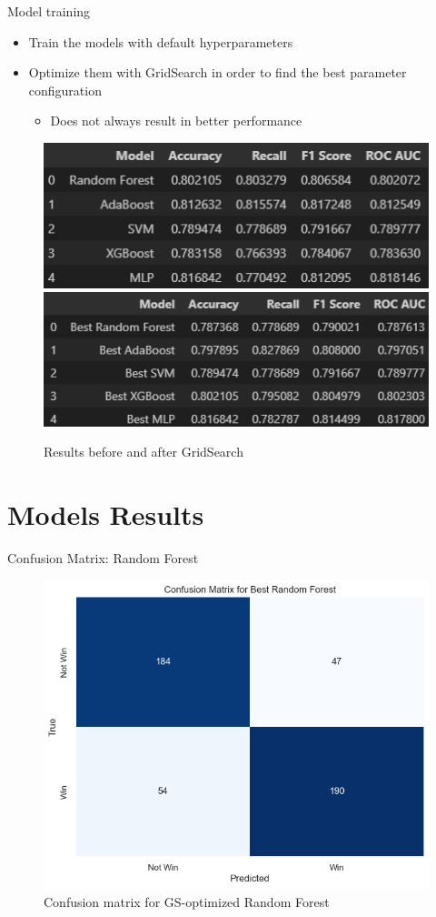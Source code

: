 \documentclass{beamer}
\begin{document}
\begin{frame}{Model training}
    \begin{itemize}
        \item Train the models with default hyperparameters
        \item Optimize them with GridSearch in order to find the best parameter configuration
            \begin{itemize}
                \item Does not always result in better performance
            \end{itemize}
    \end{itemize}
    \begin{figure}
        \centering
        \includegraphics[width=0.5\linewidth]{images/model_results.png}
        \includegraphics[width=0.5\linewidth]{images/best_model_results.png}
        \caption{Results before and after GridSearch}
        \label{fig:enter-label}
    \end{figure}
\end{frame}

\section{Models Results}
\begin{frame}{Confusion Matrix: Random Forest}
    \begin{figure}
        \centering
        \includegraphics[width=0.7\linewidth]{images/cm_randomforest.png}
        \caption{Confusion matrix for GS-optimized Random Forest}
        \label{fig:enter-label}
    \end{figure}
\end{frame}
\end{document}
